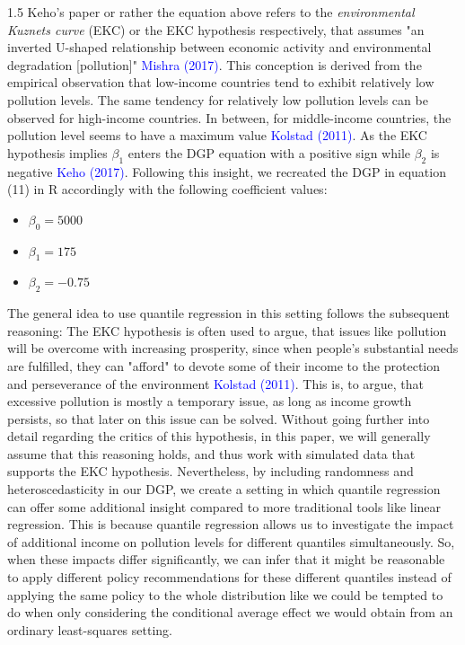 \documentclass[conference]{IEEEtran}
\begin{document}
\begin{spacing}{1.5}
Keho's paper or rather the equation above refers to the \textit{environmental Kuznets curve} (EKC) or the EKC hypothesis respectively, that assumes "an inverted U-shaped relationship between economic activity and environmental degradation [pollution]" \textcolor{blue}{Mishra (2017)}.
This conception is derived from the empirical observation that low-income countries tend to exhibit relatively low pollution levels. The same tendency for relatively low pollution levels can be observed for high-income countries. In between, for middle-income countries, the pollution level seems to have a maximum value \textcolor{blue}{Kolstad (2011)}.
As the EKC hypothesis implies $\beta_{1}$ enters the DGP equation with a positive sign while $\beta_{2}$ is negative \textcolor{blue}{Keho (2017)}.
Following this insight, we recreated the DGP in equation (11) in R accordingly with the following coefficient values:
\begin{itemize}
\item $\beta_{0} = 5000$
\item $\beta_{1} = 175$
\item $\beta_{2} = -0.75$
\end{itemize}

The general idea to use quantile regression in this setting follows the subsequent reasoning:
The EKC hypothesis is often used to argue, that issues like pollution will be overcome with increasing prosperity, since when people's substantial needs are fulfilled, they can "afford" to devote some of their income to the protection and perseverance of the environment \textcolor{blue}{Kolstad (2011)}. This is, to argue, that excessive pollution is mostly a temporary issue, as long as income growth persists, so that later on this issue can be solved. Without going further into detail regarding the critics of this hypothesis, in this paper, we will generally assume that this reasoning holds, and thus work with simulated data that supports the EKC hypothesis.
Nevertheless, by including randomness and heteroscedasticity in our DGP, we create a setting in which quantile regression can offer some additional insight compared to more traditional tools like linear regression.
This is because quantile regression allows us to investigate the impact of additional income on pollution levels for different quantiles simultaneously. So, when these impacts differ significantly, we can infer that it might be reasonable to apply different policy recommendations for these different quantiles instead of applying the same policy to the whole distribution like we could be tempted to do when only considering the conditional average effect we would obtain from an ordinary least-squares setting.


\end{spacing}
\end{document}
